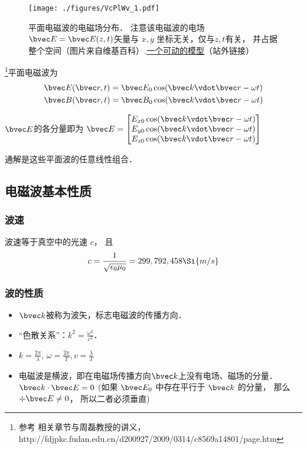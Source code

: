 

\begin{figure}[ht]
\centering
\texttt{[image: ./figures/VcPlWv\_1.pdf]}
\caption{平面电磁波的电磁场分布． 注意该电磁波的电场$\bvec E = \bvec E(z,t)$矢量与 $x, y$ 坐标无关，仅与$z,t$有关， 并占据整个空间（图片来自维基百科）.\href{https://www.geogebra.org/m/xhYwXSsH}{一个可动的模型}（站外链接）} \label{VcPlWv_fig1}
\end{figure}

\footnote{参考 \cite{GriffE} 相关章节与周磊教授的讲义，http://fdjpkc.fudan.edu.cn/d200927/2009/0314/c8569a14801/page.htm}平面电磁波为
\begin{align}
&\bvec E(\bvec r, t) = \bvec E_0 \cos(\bvec k\vdot \bvec r - \omega t)\\
&\bvec B(\bvec r, t) = \bvec B_0 \cos(\bvec k \vdot \bvec r - \omega t)
\end{align}

$\bvec E$的各分量即为
$\bvec E = 
\begin{bmatrix}
E_{x0} \cos(\bvec k\vdot \bvec r - \omega t)\\
E_{y0} \cos(\bvec k\vdot \bvec r - \omega t)\\
E_{z0} \cos(\bvec k\vdot \bvec r - \omega t)\\
\end{bmatrix}
$

通解是这些平面波的任意线性组合． 

\subsection{电磁波基本性质}
\subsubsection{波速}
波速等于真空中的光速 $c$， 且
\begin{equation}\label{VcPlWv_eq1}
c = \frac{1}{\sqrt{\epsilon_0\mu_0}} = 299,792,458 \Si{m/s}
\end{equation}

\subsubsection{波的性质}
\begin{itemize}
\item $\bvec k$被称为波矢，标志电磁波的传播方向．
\item  “色散关系”：$k^2=\frac{\omega^2}{c^2}$．
\item $k=\frac{2\pi}{\lambda}$, $\omega=\frac{2\pi}{T}, v=\frac{\lambda}{T}$
\item 电磁波是横波，即在电磁场传播方向$\bvec k$上没有电场、磁场的分量．$\bvec k \cdot \bvec E = 0$ (如果 $\bvec E_0$ 中存在平行于 $\bvec k$ 的分量， 那么 $\div \bvec E \ne 0$， 所以二者必须垂直)
\end{itemize}


